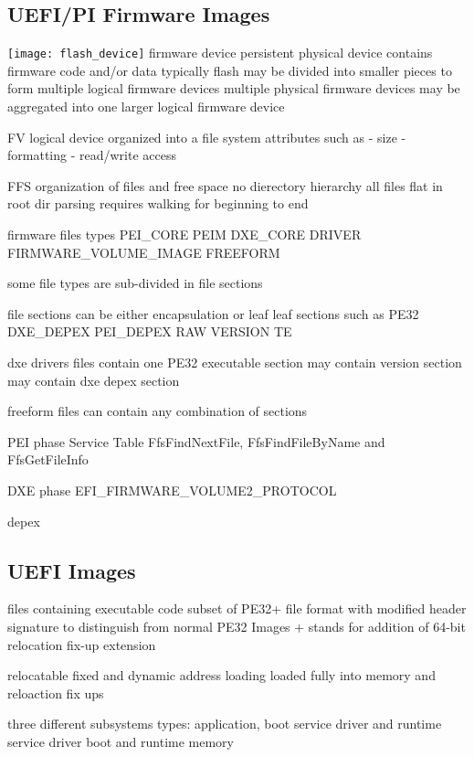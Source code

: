 \subsection{\acs{UEFI}/\acs{PI} Firmware Images}

\texttt{[image: flash\_device]}
firmware device
persistent
physical device
contains firmware code and/or data
typically flash
may be divided into smaller pieces to form multiple logical firmware devices
multiple physical firmware devices may be aggregated into one larger logical firmware device

\acf{FV}
logical device
organized into a file system
attributes such as
- size
- formatting
- read/write access

\acf{FFS}
organization of files and free space
no dierectory hierarchy
all files flat in root dir
parsing requires walking for beginning to end

firmware files
types
PEI_CORE
PEIM
DXE_CORE
DRIVER
FIRMWARE_VOLUME_IMAGE
FREEFORM

some file types are sub-divided in file sections

file sections can be either
encapsulation or leaf
leaf sections such as
PE32
DXE_DEPEX
PEI_DEPEX
RAW
VERSION
TE

dxe drivers files
contain one PE32 executable section
may contain version section
may contain dxe depex section

freeform files
can contain any combination of sections

PEI phase Service Table
FfsFindNextFile, FfsFindFileByName and FfsGetFileInfo

DXE phase
EFI_FIRMWARE_VOLUME2_PROTOCOL

depex

\cite{tianocore-edk2-build-spec}

\subsection{\acs{UEFI} Images}

files containing executable code
subset of PE32+ file format with modified header signature to distinguish from normal PE32 Images
+ stands for addition of 64-bit relocation fix-up extension

relocatable
fixed and dynamic address loading
loaded fully into memory and reloaction fix ups

three different subsystems types: application, boot service driver and runtime service driver
boot and runtime memory

